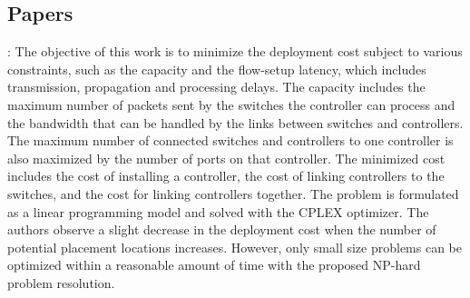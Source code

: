 \documentclass[a4paper,10pt]{article}
\begin{document}
\subsection{Papers}
\cite{SaSt15}: The objective of this work is to minimize the deployment cost subject to various constraints, such as the capacity and the flow-setup latency, which includes transmission, propagation and processing delays. The capacity includes the maximum number of packets sent by the switches the controller can process and the bandwidth that can be handled by the links between switches and controllers. The maximum number of connected switches and controllers to one controller is also maximized by the number of ports on that controller. The minimized cost includes the cost of installing a controller, the cost of linking controllers to the switches, and the cost for linking controllers together. The problem is formulated as a linear programming model and solved with the CPLEX optimizer. The authors observe a slight decrease in the deployment cost when the number of potential placement locations increases. However, only small size problems can be optimized within a reasonable amount of time with the proposed NP-hard problem resolution. 
\end{document}
